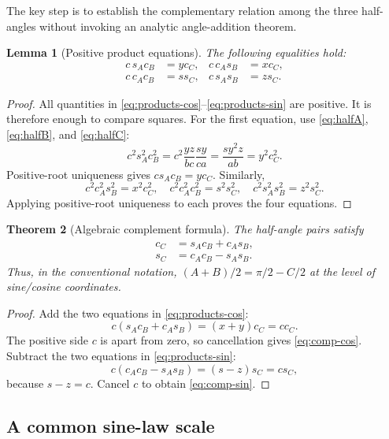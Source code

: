 \documentclass[11pt,letterpaper]{article}
\newtheorem{theorem}{Theorem}[section]
\newtheorem{lemma}[theorem]{Lemma}
\theoremstyle{definition}
\theoremstyle{remark}
\begin{document}
The key step is to establish the complementary relation among the three
half-angles without invoking an analytic angle-addition theorem.

\begin{lemma}[Positive product equations]
\label{lem:four-products}
The following equalities hold:
\begin{align}
 c\,s_Ac_B&=y c_C,
 &c\,c_As_B&=x c_C,
 \tag{3.8a}\label{eq:products-cos}\\
 c\,c_Ac_B&=s s_C,
 &c\,s_As_B&=z s_C.
 \tag{3.8b}\label{eq:products-sin}
\end{align}
\end{lemma}

\begin{proof}
All quantities in \eqref{eq:products-cos}--\eqref{eq:products-sin} are
positive.  It is therefore enough to compare squares.
For the first equation, use \eqref{eq:halfA}, \eqref{eq:halfB}, and
\eqref{eq:halfC}:
\[
 c^2s_A^2c_B^2
 =c^2\frac{yz}{bc}\frac{sy}{ca}
 =\frac{s y^2 z}{ab}
 =y^2c_C^2.
\]
Positive-root uniqueness gives \(c s_Ac_B=y c_C\).  Similarly,
\[
 c^2c_A^2s_B^2=x^2c_C^2,
\quad
 c^2c_A^2c_B^2=s^2s_C^2,
\quad
 c^2s_A^2s_B^2=z^2s_C^2.
\]
Applying positive-root uniqueness to each proves the four equations.
\end{proof}

\begin{theorem}[Algebraic complement formula]
\label{thm:complement}
The half-angle pairs satisfy
\begin{align}
 c_C&=s_Ac_B+c_As_B,
 \tag{3.9a}\label{eq:comp-cos}\\
 s_C&=c_Ac_B-s_As_B.
 \tag{3.9b}\label{eq:comp-sin}
\end{align}
Thus, in the conventional notation,
\((A+B)/2=\pi/2-C/2\) at the level of sine/cosine coordinates.
\end{theorem}

\begin{proof}
Add the two equations in \eqref{eq:products-cos}:
\[
 c(s_Ac_B+c_As_B)=(x+y)c_C=cc_C.
\]
The positive side \(c\) is apart from zero, so cancellation gives
\eqref{eq:comp-cos}.  Subtract the two equations in
\eqref{eq:products-sin}:
\[
 c(c_Ac_B-s_As_B)=(s-z)s_C=cs_C,
\]
because \(s-z=c\).  Cancel \(c\) to obtain \eqref{eq:comp-sin}.
\end{proof}

\subsection{A common sine-law scale}
\end{document}
